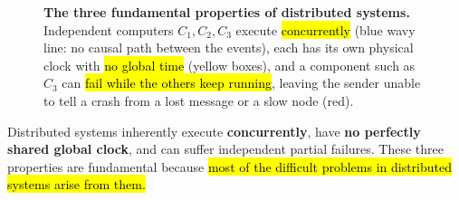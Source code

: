 \begin{figure}[!htp]
    \caption{\textbf{The three fundamental properties of distributed systems.} Independent computers $C_1, C_2, C_3$ execute \hl{concurrently} (blue wavy line: no causal path between the events), each has its own physical clock with \hl{no global time} (yellow boxes), and a component such as $C_3$ can \hl{fail while the others keep running}, leaving the sender unable to tell a crash from a lost message or a slow node (red).}
    \label{fig:fundamental-properties}
\end{figure}

\highspace
\begin{takeawaysbox}
    Distributed systems inherently execute \textbf{concurrently}, have \textbf{no perfectly shared global clock}, and can suffer independent partial failures. These three properties are fundamental because \hl{most of the difficult problems in distributed systems arise from them.}
\end{takeawaysbox}